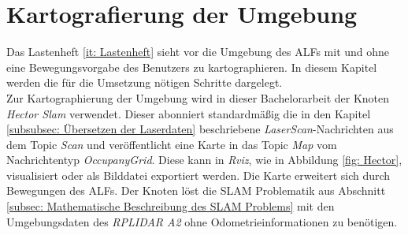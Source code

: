 %		     
%		     
		     
		\section{Kartografierung der Umgebung}
		    \label{subsec: Kartografierung und Bewegungsplanung}
		        
		        Das Lastenheft \ref{it: Lastenheft} sieht vor die Umgebung des ALFs mit und ohne eine Bewegungsvorgabe des Benutzers zu kartographieren. In diesem Kapitel werden die für die Umsetzung nötigen Schritte dargelegt.\\
		    	
		    	Zur Kartographierung der Umgebung wird in dieser Bachelorarbeit der Knoten \textit{Hector Slam} verwendet.
		   		Dieser abonniert standardmäßig die in den Kapitel \ref{subsubsec: Übersetzen der Laserdaten} beschriebene \textit{LaserScan}-Nachrichten aus dem Topic \textit{Scan} und veröffentlicht eine Karte in das Topic \textit{Map} vom Nachrichtentyp \textit{OccupanyGrid}. Diese kann in \textit{Rviz}, wie in Abbildung \ref{fig: Hector}, visualisiert oder als Bilddatei exportiert werden. Die Karte erweitert sich durch Bewegungen des ALFs. Der Knoten löst die SLAM Problematik aus Abschnitt \ref{subsec: Mathematische Beschreibung des SLAM Problems} mit den Umgebungsdaten des \textit{RPLIDAR A2} ohne Odometrieinformationen zu benötigen. \cite{hectorslam}\\
		   				   		
